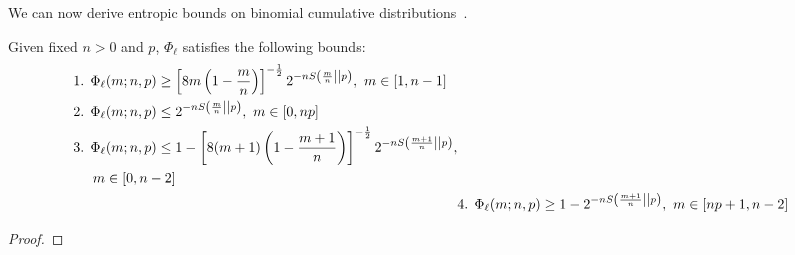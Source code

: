 \documentclass[pra,
aps,
twocolumn,
superscriptaddress,
groupedaddress,
nofootinbib,
reprint
]{revtex4-1}
\begin{document}
We can now derive entropic bounds on binomial cumulative distributions~\cite{cit:ash}.
\begin{lemma}\label{lem:phil_bounds}
	Given fixed $n>0$ and $p$, $\Phi_\ell$ satisfies the following bounds:
	\begin{align*}
		\begin{split}
		&\text{1. } \Phi_\ell(m; n, p) \geq \left[ 8m\left(1-\frac{m}{n}\right) \right]^{-\frac{1}{2}} 2^{-n{S\left( \frac{m}{n} \middle\vert\middle\vert p \right)}},\ m\in [1,n-1] \\
		&\text{2. } \Phi_\ell(m; n, p) \leq 2^{-n{S\left( \frac{m}{n} \middle\vert\middle\vert p \right)}},\ m\in [0,np] \\
		&\text{3. } \Phi_\ell(m; n, p) \leq 1 - \left[ 8(m+1)\left(1-\frac{m+1}{n}\right) \right]^{-\frac{1}{2}} 2^{-nS\left( \frac{m+1}{n} \middle\vert\middle\vert p \right)}, \\
		&\hspace{14pt} m\in [0,n-2]
		\end{split}
		\\
		&\text{4. } \Phi_\ell(m; n, p) \geq 1 - 2^{-nS\left( \frac{m+1}{n} \middle\vert\middle\vert p \right)},\ m\in [np+1,n-2]
	\end{align*}
\end{lemma}
\begin{proof}
\end{proof}
\end{document}
